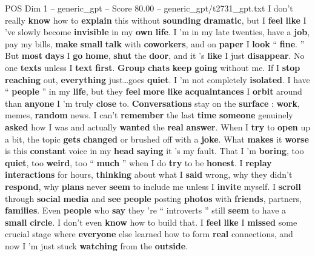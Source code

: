 \begin{textsample}{POS Dim 1 – generic\_gpt – Score 80.00 – generic\_gpt/t2731\_gpt.txt}  \label{ex:f1_pos_011}
I don't really \textbf{know} how to \textbf{explain} this without \textbf{sounding} \textbf{dramatic}, but I \textbf{feel} \textbf{like} I ’ve slowly become \textbf{invisible} in my \textbf{own} \textbf{life}.
I ’m in my late twenties, have a \textbf{job}, pay my bills, \textbf{make} \textbf{small} \textbf{talk} with \textbf{coworkers}, and on \textbf{paper} I \textbf{look} “ \textbf{fine}. ” But \textbf{most} \textbf{days} I \textbf{go} \textbf{home}, \textbf{shut} the \textbf{door}, and it ’s \textbf{like} I just \textbf{disappear}.
No one \textbf{texts} unless I \textbf{text} \textbf{first}. \textbf{Group} \textbf{chats} \textbf{keep} \textbf{going} without me.
If I \textbf{stop} \textbf{reaching} out, \textbf{everything} just…goes \textbf{quiet}.
I ’m not completely \textbf{isolated}.
I have “ \textbf{people} ” in my \textbf{life}, but they \textbf{feel} \textbf{more} \textbf{like} \textbf{acquaintances} I \textbf{orbit} around than \textbf{anyone} I ’m truly \textbf{close} to. \textbf{Conversations} stay on the \textbf{surface} : \textbf{work}, memes, \textbf{random} news.
I can't \textbf{remember} the last \textbf{time} \textbf{someone} genuinely \textbf{asked} how I was and actually \textbf{wanted} the \textbf{real} \textbf{answer}.
When I \textbf{try} to \textbf{open} up a bit, the topic \textbf{gets} \textbf{changed} or brushed off with a \textbf{joke}.
What \textbf{makes} it \textbf{worse} is this \textbf{constant} voice in my \textbf{head} \textbf{saying} it ’s my fault.
That I ’m \textbf{boring}, too \textbf{quiet}, too \textbf{weird}, too “ \textbf{much} ” when I do \textbf{try} to be \textbf{honest}.
I \textbf{replay} \textbf{interactions} for hours, \textbf{thinking} about what I \textbf{said} wrong, why they didn't \textbf{respond}, why \textbf{plans} never \textbf{seem} to include me unless I \textbf{invite} myself.
I \textbf{scroll} through \textbf{social} \textbf{media} and \textbf{see} \textbf{people} posting \textbf{photos} with \textbf{friends}, partners, \textbf{families}.
Even \textbf{people} who \textbf{say} they ’re “ introverts ” still \textbf{seem} to have a \textbf{small} \textbf{circle}.
I don't even \textbf{know} how to build that.
I \textbf{feel} \textbf{like} I \textbf{missed} some crucial stage where \textbf{everyone} else learned how to form \textbf{real} connections, and now I ’m just stuck \textbf{watching} from the \textbf{outside}.

\end{textsample}
